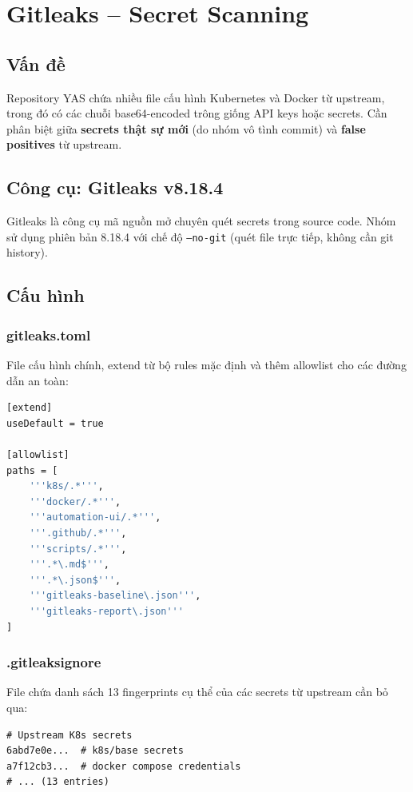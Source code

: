 \section{Gitleaks -- Secret Scanning}
\label{sec:gitleaks}

\subsection{Vấn đề}
Repository YAS chứa nhiều file cấu hình Kubernetes và Docker từ upstream, trong đó có các chuỗi base64-encoded trông giống API keys hoặc secrets. Cần phân biệt giữa \textbf{secrets thật sự mới} (do nhóm vô tình commit) và \textbf{false positives} từ upstream.

\subsection{Công cụ: Gitleaks v8.18.4}
Gitleaks là công cụ mã nguồn mở chuyên quét secrets trong source code. Nhóm sử dụng phiên bản 8.18.4 với chế độ \texttt{--no-git} (quét file trực tiếp, không cần git history).

\subsection{Cấu hình}

\subsubsection{gitleaks.toml}
File cấu hình chính, extend từ bộ rules mặc định và thêm allowlist cho các đường dẫn an toàn:

\begin{lstlisting}[language=bash, caption={gitleaks.toml}]
[extend]
useDefault = true

[allowlist]
paths = [
    '''k8s/.*''',
    '''docker/.*''',
    '''automation-ui/.*''',
    '''.github/.*''',
    '''scripts/.*''',
    '''.*\.md$''',
    '''.*\.json$''',
    '''gitleaks-baseline\.json''',
    '''gitleaks-report\.json'''
]
\end{lstlisting}

\subsubsection{.gitleaksignore}
File chứa danh sách 13 fingerprints cụ thể của các secrets từ upstream cần bỏ qua:

\begin{lstlisting}[caption={.gitleaksignore (trích)}]
# Upstream K8s secrets
6abd7e0e...  # k8s/base secrets
a7f12cb3...  # docker compose credentials
# ... (13 entries)
\end{lstlisting}

